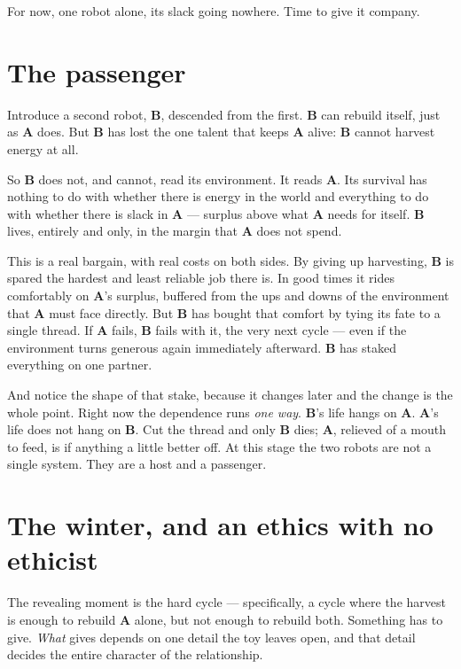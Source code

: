 \documentclass{article}
\begin{document}
For now, one robot alone, its slack going nowhere. Time to give it company.

\section*{The passenger}

Introduce a second robot, \textbf{B}, descended from the first. \textbf{B} can rebuild itself, just as \textbf{A} does. But \textbf{B} has lost the one talent that keeps \textbf{A} alive: \textbf{B} cannot harvest energy at all.

So \textbf{B} does not, and cannot, read its environment. It reads \textbf{A}. Its survival has nothing to do with whether there is energy in the world and everything to do with whether there is slack in \textbf{A} --- surplus above what \textbf{A} needs for itself. \textbf{B} lives, entirely and only, in the margin that \textbf{A} does not spend.

This is a real bargain, with real costs on both sides. By giving up harvesting, \textbf{B} is spared the hardest and least reliable job there is. In good times it rides comfortably on \textbf{A}'s surplus, buffered from the ups and downs of the environment that \textbf{A} must face directly. But \textbf{B} has bought that comfort by tying its fate to a single thread. If \textbf{A} fails, \textbf{B} fails with it, the very next cycle --- even if the environment turns generous again immediately afterward. \textbf{B} has staked everything on one partner.

And notice the shape of that stake, because it changes later and the change is the whole point. Right now the dependence runs \emph{one way}. \textbf{B}'s life hangs on \textbf{A}. \textbf{A}'s life does not hang on \textbf{B}. Cut the thread and only \textbf{B} dies; \textbf{A}, relieved of a mouth to feed, is if anything a little better off. At this stage the two robots are not a single system. They are a host and a passenger.

\section*{The winter, and an ethics with no ethicist}

The revealing moment is the hard cycle --- specifically, a cycle where the harvest is enough to rebuild \textbf{A} alone, but not enough to rebuild both. Something has to give. \emph{What} gives depends on one detail the toy leaves open, and that detail decides the entire character of the relationship.
\end{document}
